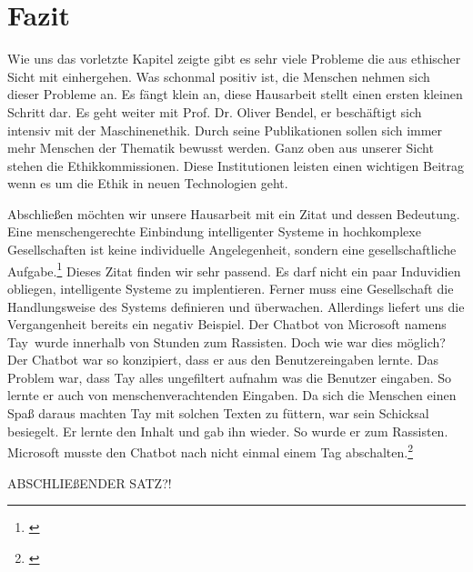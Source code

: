 \section{Fazit}
Wie uns das vorletzte Kapitel zeigte gibt es sehr viele Probleme die aus ethischer Sicht mit einhergehen. Was schonmal positiv ist, die Menschen nehmen sich dieser Probleme an. Es fängt klein an, diese Hausarbeit stellt einen ersten kleinen Schritt dar. Es geht weiter mit Prof. Dr. Oliver Bendel, er beschäftigt sich intensiv mit der Maschinenethik. Durch seine Publikationen sollen sich immer mehr Menschen der Thematik bewusst werden. Ganz oben aus unserer Sicht stehen die Ethikkommissionen. Diese Institutionen leisten einen wichtigen Beitrag wenn es um die Ethik in neuen Technologien geht.

Abschließen möchten wir unsere Hausarbeit mit ein Zitat und dessen Bedeutung. 
\glqq Eine menschengerechte Einbindung intelligenter Systeme in hochkomplexe Gesellschaften ist keine individuelle Angelegenheit, sondern eine gesellschaftliche Aufgabe.\grqq\footnote{\cite{BitkomZitat}}
Dieses Zitat finden wir sehr passend. Es darf nicht ein paar Induvidien obliegen, intelligente Systeme zu implentieren. Ferner muss eine Gesellschaft die Handlungsweise des Systems definieren und überwachen. Allerdings liefert uns die Vergangenheit bereits ein negativ Beispiel. \newline
Der Chatbot von Microsoft namens \glqq Tay\grqq\ wurde innerhalb von Stunden zum Rassisten. Doch wie war dies möglich? Der Chatbot war so konzipiert, dass er aus den Benutzereingaben lernte. Das Problem war, dass Tay alles ungefiltert aufnahm was die Benutzer eingaben. So lernte er auch von menschenverachtenden Eingaben. Da sich die Menschen einen Spaß daraus machten Tay mit solchen Texten zu \glqq füttern\grqq, war sein Schicksal besiegelt. Er lernte den Inhalt und gab ihn wieder. So wurde er zum Rassisten. Microsoft musste den Chatbot nach nicht einmal einem Tag abschalten.\footnote{\cite{TaySpiegel}} 

ABSCHLIEßENDER SATZ?!


